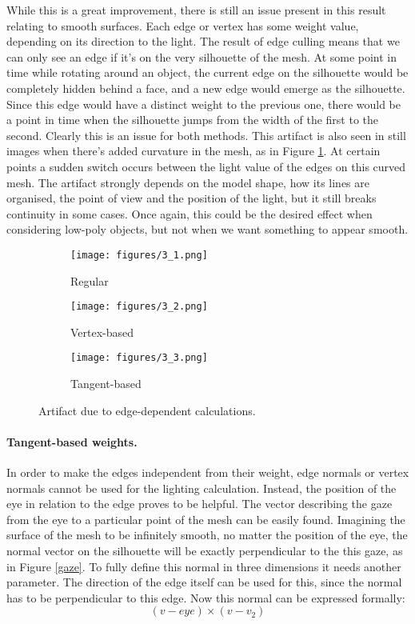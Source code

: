 \documentclass[a4paper,10pt]{article}
\begin{document}
While this is a great improvement, there is still an issue present in this result relating to smooth surfaces. Each edge or vertex has some weight value, depending on its direction to the light. The result of edge culling means that we can only see an edge if it's on the very silhouette of the mesh. At some point in time while rotating around an object, the current edge on the silhouette would be completely hidden behind a face, and a new edge would emerge as the silhouette. Since this edge would have a distinct weight to the previous one, there would be a point in time when the silhouette jumps from the width of the first to the second. Clearly this is an issue for both methods. This artifact is also seen in still images when there's added curvature in the mesh, as in Figure \ref{turn}. At certain points a sudden switch occurs between the light value of the edges on this curved mesh. The artifact strongly depends on the model shape, how its lines are organised, the point of view and the position of the light, but it still breaks continuity in some cases. Once again, this could be the desired effect when considering low-poly objects, but not when we want something to appear smooth. 

\begin{figure}[htbp!]
  \centering
  \begin{subfigure}{0.25\columnwidth}
    \texttt{[image: figures/3\_1.png]}
    \caption{Regular}
  \end{subfigure}
  \begin{subfigure}{0.25\columnwidth}
    \texttt{[image: figures/3\_2.png]}
    \caption{Vertex-based}
  \end{subfigure}
  \begin{subfigure}{0.25\columnwidth}
    \texttt{[image: figures/3\_3.png]}
    \caption{Tangent-based}
  \end{subfigure}
  \caption{Artifact due to edge-dependent calculations.}
  \label{turn}
\end{figure}

\paragraph{Tangent-based weights.}
In order to make the edges independent from their weight, edge normals or vertex normals cannot be used for the lighting calculation. Instead, the position of the eye in relation to the edge proves to be helpful. The vector describing the gaze from the eye to a particular point of the mesh can be easily found. Imagining the surface of the mesh to be infinitely smooth, no matter the position of the eye, the normal vector on the silhouette will be exactly perpendicular to the this gaze, as in Figure \ref{gaze}. To fully define this normal in three dimensions it needs another parameter. The direction of the edge itself can be used for this, since the normal has to be perpendicular to this edge. Now this normal can be expressed formally:
$$(v-eye) \times (v-v_2)$$
\end{document}
